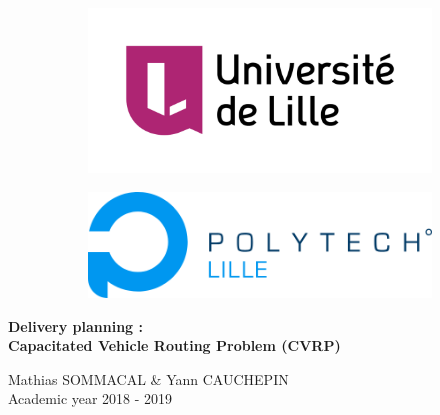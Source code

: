 \begin{titlepage}

	\begin{figure}[t]
		\begin{subfigure}[h]{0.5\linewidth}
			
			\begin{flushleft}
				\includegraphics[scale=0.2]{Media/UniversiteLille.png}
			\end{flushleft}
		\end{subfigure}
		\begin{subfigure}[h]{0.5\linewidth}
			\begin{flushright}
				\includegraphics[scale=0.25]{Media/PolytechLille.png}
			\end{flushright}
		\end{subfigure}

	\end{figure}

	\centering 

	\huge
	\vspace*{4cm}
	\textbf{Delivery planning :\\
Capacitated Vehicle Routing Problem (CVRP)}

	\Large

	\vspace{6cm}
	Mathias SOMMACAL \& Yann CAUCHEPIN\\

	\vspace{1cm}
	Academic year 2018 - 2019\\


\end{titlepage}